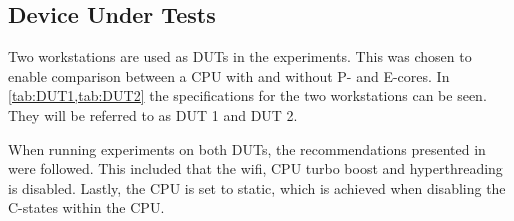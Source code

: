 \subsection{Device Under Tests}
Two workstations are used as DUTs in the experiments. This was chosen to enable comparison between a CPU with and without P- and E-cores. In \cref {tab:DUT1,tab:DUT2} the specifications for the two workstations can be seen. They will be referred to as DUT 1 and DUT 2. 




When running experiments on both DUTs, the recommendations presented in \cite{Lindholt2022} were followed. This included that the wifi, CPU turbo boost and hyperthreading is disabled. Lastly, the CPU is set to static, which is achieved when disabling the C-states within the CPU.
